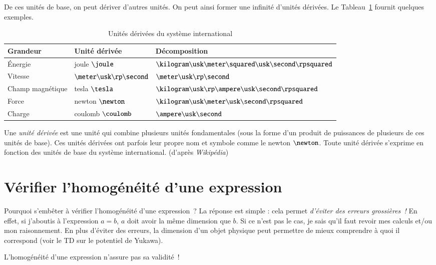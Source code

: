 \documentclass[12pt]{book}
\begin{document}
De ces unités de base, on peut dériver d'autres unités. On peut ainsi former une
infinité d'unités dérivées. Le Tableau~\ref{usi_deriv} fournit quelques exemples.

\begin{table}[ht!]
	\centering
	\caption{Unités dérivées du système international}
	\begin{tabular}{lll}
		\textbf{Grandeur} & \textbf{Unité dérivée} & \textbf{Décomposition}\\ \hline
		Énergie & joule $\joule$ & $\kilogram \usk \meter \squared \usk \second \rpsquared$\\
		Vitesse &  $\meter \usk \rp \second$ & $\meter \usk \rp \second$\\
		Champ magnétique & tesla $\tesla$ & $\kilogram \usk \rp \ampere \usk \second \rpsquared$ \\ 
		Force & newton $\newton$  & $\kilogram \usk \meter \usk \second \rpsquared$ \\
		Charge & coulomb $\coulomb$ &  $\ampere \usk \second$
	\end{tabular}
	\label{usi_deriv}
\end{table}

\begin{defn}
Une \emph{unité dérivée} est une unité qui combine plusieurs unités fondamentales
(sous la forme d'un produit de puissances de plusieurs de ces unités de base).
Ces unités dérivées ont parfois leur propre nom et symbole comme le newton
$\newton$. Toute unité dérivée s'exprime en fonction des unités de base du système 
international. (d'après \textit{Wikipédia})

\end{defn}


\section{Vérifier l'homogénéité d'une expression}
Pourquoi s'embêter à vérifier l'homogénéité d'une expression~?
La réponse est simple : cela permet \emph{d'éviter des erreurs grossières~!} En effet,
si j'aboutis à l'expression $a = b$, $a$ doit avoir la même dimension que $b$. 
Si ce n'est pas le cas, je sais qu'il faut revoir mes calculs et/ou mon raisonnement.
En plus d'éviter des erreurs, la dimension d'un objet physique 
peut permettre de mieux comprendre à quoi il correspond (voir le TD sur le
potentiel de Yukawa). 

\begin{attention}
	L'homogénéité d'une expression n'assure pas sa validité~!
\end{attention}
\end{document}
